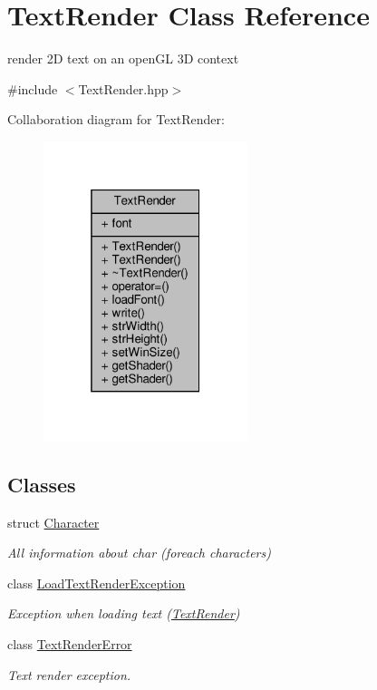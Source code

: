 \hypertarget{class_text_render}{}\section{Text\+Render Class Reference}
\label{class_text_render}


render 2D text on an open\+GL 3D context  




{\ttfamily \#include $<$Text\+Render.\+hpp$>$}



Collaboration diagram for Text\+Render\+:
\nopagebreak
\begin{figure}[H]
\begin{center}
\leavevmode
\includegraphics[width=169pt]{class_text_render__coll__graph}
\end{center}
\end{figure}
\subsection*{Classes}
\begin{DoxyCompactItemize}
\item 
struct \hyperlink{struct_text_render_1_1_character}{Character}
\begin{DoxyCompactList}\small\item\em All information about char (foreach characters) \end{DoxyCompactList}\item 
class \hyperlink{class_text_render_1_1_load_text_render_exception}{Load\+Text\+Render\+Exception}
\begin{DoxyCompactList}\small\item\em Exception when loading text (\hyperlink{class_text_render}{Text\+Render}) \end{DoxyCompactList}\item 
class \hyperlink{class_text_render_1_1_text_render_error}{Text\+Render\+Error}
\begin{DoxyCompactList}\small\item\em Text render exception. \end{DoxyCompactList}\end{DoxyCompactItemize}
